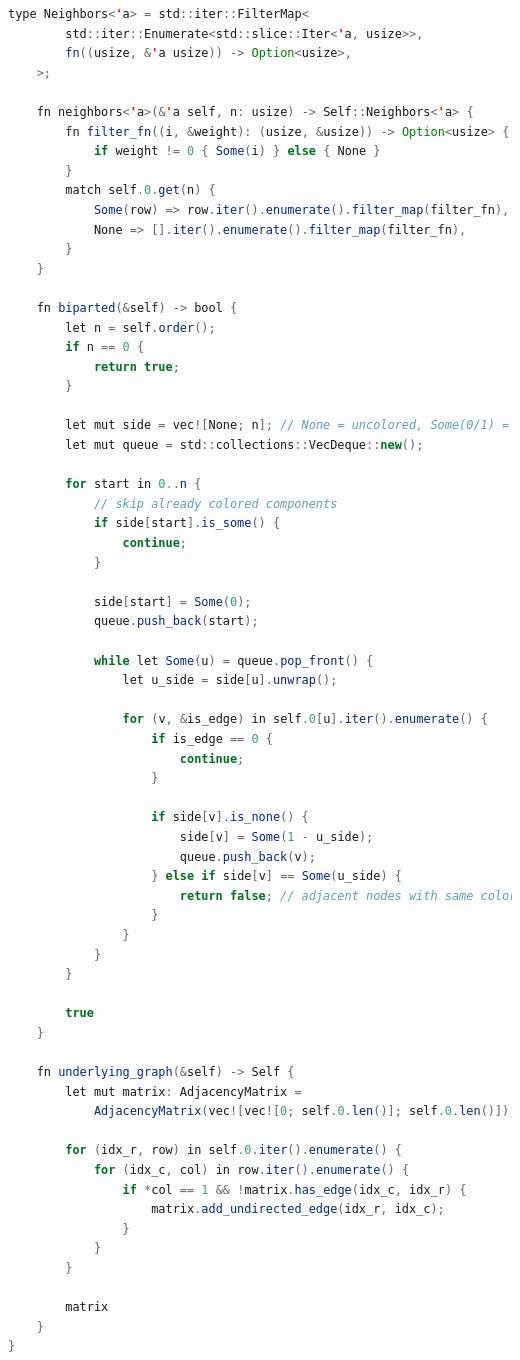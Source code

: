 \begin{lstlisting}[language=Java, caption={Implementação de Graph na Estrutura de Dados Matriz de Adjacência}, label=list:impl_adj_mat_g]
    type Neighbors<'a> = std::iter::FilterMap<
        std::iter::Enumerate<std::slice::Iter<'a, usize>>,
        fn((usize, &'a usize)) -> Option<usize>,
    >;

    fn neighbors<'a>(&'a self, n: usize) -> Self::Neighbors<'a> {
        fn filter_fn((i, &weight): (usize, &usize)) -> Option<usize> {
            if weight != 0 { Some(i) } else { None }
        }
        match self.0.get(n) {
            Some(row) => row.iter().enumerate().filter_map(filter_fn),
            None => [].iter().enumerate().filter_map(filter_fn),
        }
    }

    fn biparted(&self) -> bool {
        let n = self.order();
        if n == 0 {
            return true;
        }

        let mut side = vec![None; n]; // None = uncolored, Some(0/1) = partition
        let mut queue = std::collections::VecDeque::new();

        for start in 0..n {
            // skip already colored components
            if side[start].is_some() {
                continue;
            }

            side[start] = Some(0);
            queue.push_back(start);

            while let Some(u) = queue.pop_front() {
                let u_side = side[u].unwrap();

                for (v, &is_edge) in self.0[u].iter().enumerate() {
                    if is_edge == 0 {
                        continue;
                    }

                    if side[v].is_none() {
                        side[v] = Some(1 - u_side);
                        queue.push_back(v);
                    } else if side[v] == Some(u_side) {
                        return false; // adjacent nodes with same color
                    }
                }
            }
        }

        true
    }

    fn underlying_graph(&self) -> Self {
        let mut matrix: AdjacencyMatrix =
            AdjacencyMatrix(vec![vec![0; self.0.len()]; self.0.len()]);

        for (idx_r, row) in self.0.iter().enumerate() {
            for (idx_c, col) in row.iter().enumerate() {
                if *col == 1 && !matrix.has_edge(idx_c, idx_r) {
                    matrix.add_undirected_edge(idx_r, idx_c);
                }
            }
        }

        matrix
    }
}
\end{lstlisting}


